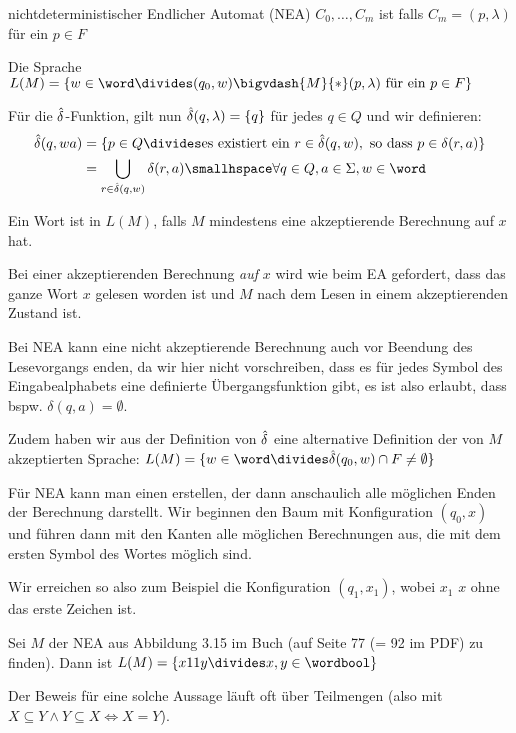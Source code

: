 \begin{definition}[]{nichtdeterministischer Endlicher Automat (NEA)}
    $C_0, \ldots, C_m$ ist  falls $C_m = (p, \lambda)$ für ein $p \in F$

    Die Sprache $L(M) = \{ w \in \word \divides (q_0, w) \bigvdash{M}{*} (p, \lambda) \text{ für ein } p \in F \}$

    Für die $\hat{\delta}$-Funktion, gilt nun $\hat{\delta}(q, \lambda) = \{ q \}$ für jedes $q \in Q$ und wir definieren:
    \begin{align*}
        \hdelta(q, wa) & = \{ p \in Q \divides \text{es existiert ein } r \in \hdelta(q, w), \text{ so dass } p \in \delta(r, a) \} \\
                       & = \bigcup_{r \in \hdelta(q, w)} \delta(r, a) \smallhspace \forall q \in Q, a \in \Sigma, w \in \word
    \end{align*}
\end{definition}
Ein Wort ist in $L(M)$, falls $M$ mindestens eine akzeptierende Berechnung auf $x$ hat.

Bei einer akzeptierenden Berechnung \textit{auf} $x$ wird wie beim EA gefordert, dass das ganze Wort $x$ gelesen worden ist und $M$ nach dem Lesen in einem akzeptierenden Zustand ist.

Bei NEA kann eine nicht akzeptierende Berechnung auch vor Beendung des Lesevorgangs enden, da wir hier nicht vorschreiben,
dass es für jedes Symbol des Eingabealphabets eine definierte Übergangsfunktion gibt, es ist also erlaubt, dass bspw. $\delta(q, a) = \emptyset$.

Zudem haben wir aus der Definition von $\hat{\delta}$ eine alternative Definition der von $M$ akzeptierten Sprache:
$L(M) = \{ w \in \word \divides \hdelta(q_0, w) \cap F \neq \emptyset \}$

Für NEA kann man einen  erstellen, der dann anschaulich alle möglichen Enden der Berechnung darstellt.
Wir beginnen den Baum mit Konfiguration $(q_0, x)$ und führen dann mit den Kanten alle möglichen Berechnungen aus, die mit dem ersten Symbol des Wortes möglich sind.

Wir erreichen so also zum Beispiel die Konfiguration $(q_1, x_1)$, wobei $x_1$ $x$ ohne das erste Zeichen ist.


 Sei $M$ der NEA aus Abbildung 3.15 im Buch (auf Seite 77 (= 92 im PDF) zu finden). 
Dann ist $L(M) = \{ x11y \divides x, y \in \wordbool \}$

Der Beweis für eine solche Aussage läuft oft über Teilmengen (also mit $X \subseteq Y \land Y \subseteq X \Leftrightarrow X = Y$).


